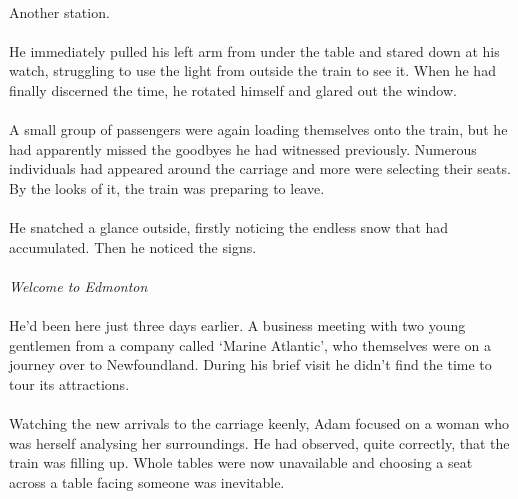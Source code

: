 \documentclass{article}
\begin{document}
\paragraph{}
Another station.

\paragraph{}
He immediately pulled his left arm from under the table and stared down at his watch, struggling to use the light from outside the train to see it. When he had finally discerned the time, he rotated himself and glared out the window.

\paragraph{}
A small group of passengers were again loading themselves onto the train, but he had apparently missed the goodbyes he had witnessed previously. Numerous individuals had appeared around the carriage and more were selecting their seats. By the looks of it, the train was preparing to leave.

\paragraph{}
He snatched a glance outside, firstly noticing the endless snow that had accumulated. Then he noticed the signs.

\paragraph{}
\emph{Welcome to Edmonton}

\paragraph{}
He'd been here just three days earlier. A business meeting with two young gentlemen from a company called `Marine Atlantic', who themselves were on a journey over to Newfoundland. During his brief visit he didn't find the time to tour its attractions.

\paragraph{}
Watching the new arrivals to the carriage keenly, Adam focused on a woman who was herself analysing her surroundings. He had observed, quite correctly, that the train was filling up. Whole tables were now unavailable and choosing a seat across a table facing someone was inevitable.
\end{document}
